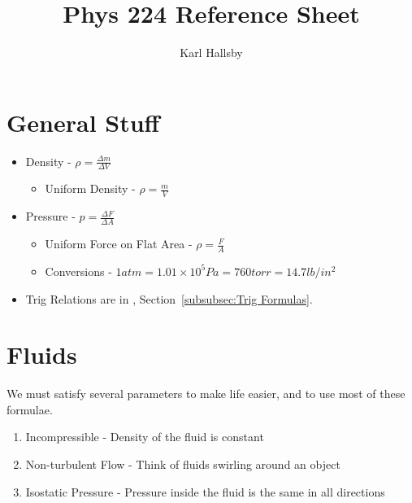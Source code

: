 \documentclass[10pt,letterpaper,final,twoside,notitlepage]{article}
\author{Karl Hallsby}
\title{Phys 224 Reference Sheet}
\numberwithin{equation}{section} %
\theoremstyle{definition}
\theoremstyle{remark}
\begin{document}
\section{General Stuff} \label{sec:General}
	\begin{itemize}[noitemsep]
		\item Density - $\rho = \frac{\Delta m}{\Delta V}$
			\begin{itemize}
				\item Uniform Density - $\rho = \frac{m}{V}$
			\end{itemize}
		
		\item Pressure - $p = \frac{\Delta F}{\Delta A}$
			\begin{itemize}
				\item Uniform Force on Flat Area - $\rho = \frac{F}{A}$
				\item Conversions - $1 atm = 1.01 \times 10^5 Pa = 760 torr = 14.7 lb/in^2$
			\end{itemize}
		\item Trig Relations are in , Section~\ref{subsubsec:Trig Formulas}.
	\end{itemize}

\section{Fluids} \label{sec:Fluids}
We must satisfy several parameters to make life easier, and to use most of these formulae.
	\begin{enumerate}[noitemsep]
		\item Incompressible - Density of the fluid is constant
		\item Non-turbulent Flow - Think of fluids swirling around an object
		\item Isostatic Pressure - Pressure inside the fluid is the same in all directions
	\end{enumerate}
\end{document}
